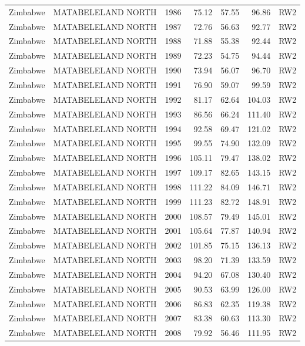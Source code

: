 \begin{longtable}{lllrrrl}
  Zimbabwe & MATABELELAND NORTH & 1986 & 75.12 & 57.55 & 96.86 & RW2 \\ 
  Zimbabwe & MATABELELAND NORTH & 1987 & 72.76 & 56.63 & 92.77 & RW2 \\ 
  Zimbabwe & MATABELELAND NORTH & 1988 & 71.88 & 55.38 & 92.44 & RW2 \\ 
  Zimbabwe & MATABELELAND NORTH & 1989 & 72.23 & 54.75 & 94.44 & RW2 \\ 
  Zimbabwe & MATABELELAND NORTH & 1990 & 73.94 & 56.07 & 96.70 & RW2 \\ 
  Zimbabwe & MATABELELAND NORTH & 1991 & 76.90 & 59.07 & 99.59 & RW2 \\ 
  Zimbabwe & MATABELELAND NORTH & 1992 & 81.17 & 62.64 & 104.03 & RW2 \\ 
  Zimbabwe & MATABELELAND NORTH & 1993 & 86.56 & 66.24 & 111.40 & RW2 \\ 
  Zimbabwe & MATABELELAND NORTH & 1994 & 92.58 & 69.47 & 121.02 & RW2 \\ 
  Zimbabwe & MATABELELAND NORTH & 1995 & 99.55 & 74.90 & 132.09 & RW2 \\ 
  Zimbabwe & MATABELELAND NORTH & 1996 & 105.11 & 79.47 & 138.02 & RW2 \\ 
  Zimbabwe & MATABELELAND NORTH & 1997 & 109.17 & 82.65 & 143.15 & RW2 \\ 
  Zimbabwe & MATABELELAND NORTH & 1998 & 111.22 & 84.09 & 146.71 & RW2 \\ 
  Zimbabwe & MATABELELAND NORTH & 1999 & 111.23 & 82.72 & 148.91 & RW2 \\ 
  Zimbabwe & MATABELELAND NORTH & 2000 & 108.57 & 79.49 & 145.01 & RW2 \\ 
  Zimbabwe & MATABELELAND NORTH & 2001 & 105.64 & 77.87 & 140.94 & RW2 \\ 
  Zimbabwe & MATABELELAND NORTH & 2002 & 101.85 & 75.15 & 136.13 & RW2 \\ 
  Zimbabwe & MATABELELAND NORTH & 2003 & 98.20 & 71.39 & 133.59 & RW2 \\ 
  Zimbabwe & MATABELELAND NORTH & 2004 & 94.20 & 67.08 & 130.40 & RW2 \\ 
  Zimbabwe & MATABELELAND NORTH & 2005 & 90.53 & 63.99 & 126.00 & RW2 \\ 
  Zimbabwe & MATABELELAND NORTH & 2006 & 86.83 & 62.35 & 119.38 & RW2 \\ 
  Zimbabwe & MATABELELAND NORTH & 2007 & 83.38 & 60.63 & 113.30 & RW2 \\ 
  Zimbabwe & MATABELELAND NORTH & 2008 & 79.92 & 56.46 & 111.95 & RW2 \\ 

\end{longtable}
